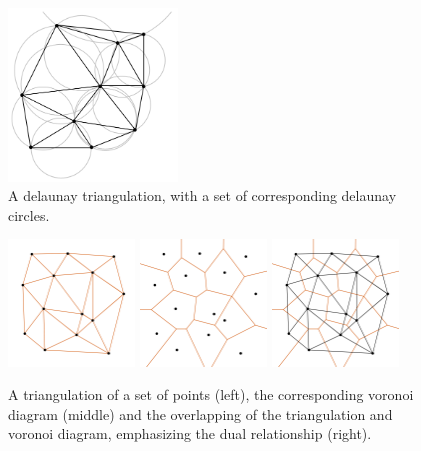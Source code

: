 \documentclass[a4paper,12pt]{article}
\begin{document}
\begin{figure}[hb]
\centering
\includegraphics[width=0.4\textwidth]{pictures/Delaunay_circumcircles.png}
 \caption[Close up of \textit{Hemidactylus} sp.]
{A delaunay triangulation, with a set of corresponding delaunay circles.}
\end{figure}



\begin{figure}[hb]
\centering
\includegraphics[width=0.3\textwidth]{pictures/Delaunay-Triangulation1.png}
\includegraphics[width=0.3\textwidth]{pictures/Delaunay-Triangulation2.png}
\includegraphics[width=0.3\textwidth]{pictures/Delaunay-Triangulation3.png}
 \caption[Close up of \textit{Hemidactylus} sp.]{
A triangulation of a set of points (left), the corresponding voronoi diagram (middle) and the overlapping of the triangulation and voronoi diagram, emphasizing the dual relationship (right).}
\end{figure}
\end{document}
